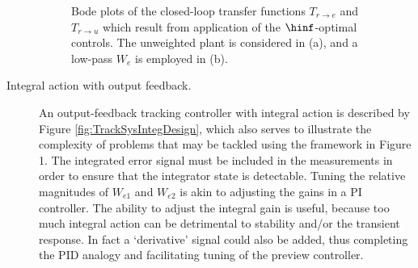 \begin{description}
\begin{figure}

\caption{Bode plots of the closed-loop transfer functions $T_{r\rightarrow e}$ and $T_{r\rightarrow u}$ which result from application of the $\hinf$-optimal controls.\label{fig:sigmah2} The unweighted plant is considered in (a), and a low-pass $W_e$ is employed in (b).}
\end{figure}
\item[Integral action with output feedback.]
An output-feedback tracking controller with integral action is described by Figure \ref{fig:TrackSysIntegDesign}, which also serves to
illustrate the complexity of problems that may be tackled  using the framework in Figure 1. The integrated error signal must be included in the measurements in order to ensure that the integrator state is detectable. 
Tuning the relative magnitudes of $W_{e1}$ and $W_{e2}$ is akin to adjusting the gains in a PI controller. The ability to adjust the integral gain is useful, because too much integral action can be detrimental to stability and/or the transient response. In fact a `derivative' signal could also be added, thus completing the PID analogy and facilitating tuning of the preview controller. 


\end{description}
